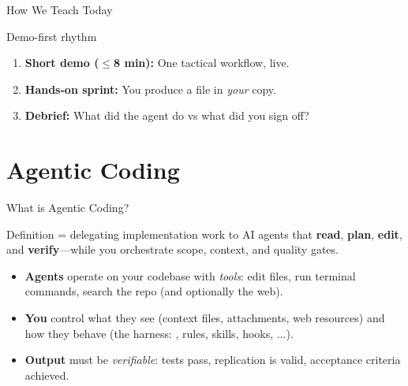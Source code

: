 \begin{frame}{How We Teach Today}
  \begin{block}{Demo-first rhythm}
    \begin{enumerate}
      \item \textbf{Short demo ($\leq$8 min):} \textnormal{One tactical workflow, live.}
      \item \textbf{Hands-on sprint:} \textnormal{You produce a file in \emph{your}  copy.}
      \item \textbf{Debrief:} \textnormal{What did the agent do vs what did you sign off?}
    \end{enumerate}
  \end{block}
  \vspace{0.3em}
\end{frame}

\section{Agentic Coding}

\begin{frame}{What is Agentic Coding?}
  \begin{block}{Definition}
     = delegating implementation work to AI agents that \textbf{read}, \textbf{plan}, \textbf{edit}, and \textbf{verify}---while you orchestrate scope, context, and quality gates.
  \end{block}
  \vspace{0.4em}
  \begin{itemize}
    \item \textbf{Agents} \textnormal{operate on your codebase with \emph{tools}: edit files, run terminal commands, search the repo (and optionally the web).}
    \item \textbf{You} \textnormal{control what they see (context files, attachments, web resources) and how they behave (the harness: , rules, skills, hooks, ...).}
    \item \textbf{Output} \textnormal{must be \emph{verifiable}: tests pass, replication is valid, acceptance criteria achieved.}
  \end{itemize}
\end{frame}

